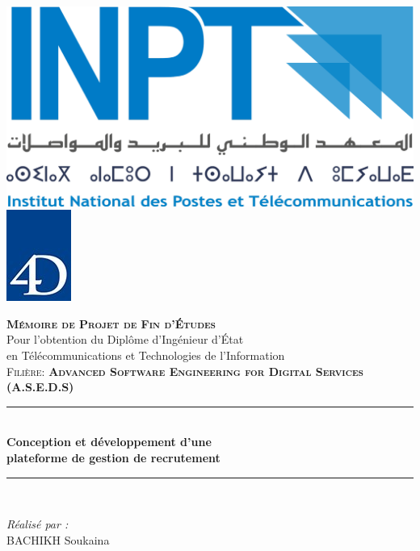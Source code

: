 \begin{titlepage}

\includegraphics[scale=0.11]{Images/logo-inpt.png}
\hspace{9.0cm}
\includegraphics[scale=0.8]{Images/logo-4d.jpg}

\vspace{2cm}


\centering
{\LARGE \textsc{\textbf{Mémoire de Projet de Fin d’Études }}}\\[0.3cm]
{\large Pour l’obtention du Diplôme d’Ingénieur d’État\\ en Télécommunications et Technologies de l’Information }\\[0.3cm]
{ \textsc{Filière: \textbf{Advanced Software Engineering for Digital Services (A.S.E.D.S)} }}\\[0.1cm]
\vspace{1cm}

\rule{\linewidth}{0.4mm} \\[0.6cm] %
{ \huge \textbf{Conception et développement d'une }\\[0.2cm]\textbf{plateforme de gestion de recrutement 
 }} \\[0.8cm]
\rule{\linewidth}{0.4mm} \\[0.4cm]
\vspace{1cm}
\noindent
\begin{minipage}{0.9\textwidth}
    \vspace{-7mm}
  \begin{flushleft} \large
    \emph{Réalisé par :} \\
    \textsc{BACHIKH} Soukaina  \\
    

\end{flushleft}
\end{minipage}
\end{titlepage}
